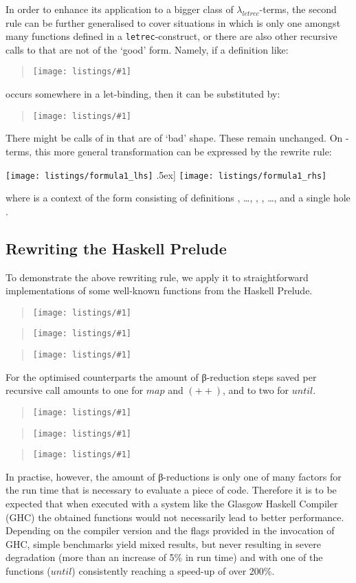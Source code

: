 \documentclass[submission,copyright,creativecommons]{eptcs}
\newcommand{\lambdaletrec}{\ensuremath{\lambda_\textit{letrec}}}
\newcommand{\letrec}{\texttt{letrec}}
\newcommand\listing[1]{\begin{quotation}\noindent\texttt{[image: listings/\#1]}\end{quotation}}
\newcommand\haskell[1]{\ensuremath{\mathit{#1}}}
\newcommand{\nbd}{\nobreakdash}
\renewcommand\;{\,}
\begin{document}
In order to enhance its application to a bigger class of \lambdaletrec\nbd-terms,
the second rule can be further generalised
to cover situations in which  is only one amongst many functions defined in
a \letrec\nbd-construct, or there
are also other recursive calls to  that are not of the `good' form. 
Namely, if a definition like: \listing{formula_lhs} occurs somewhere in a
let-binding, then it can be substituted by: \listing{formula_rhs}
There might be calls of  in  that are of `bad' shape. These remain unchanged. 
On \nbd-terms, this more general transformation can be expressed by the rewrite rule:
\begin{flushleft}
\vspace*{-0.5ex}
  \hspace*{6ex}\texttt{[image: listings/formula1\_lhs]}
  \0.5ex]
  \hspace*{6ex}\texttt{[image: listings/formula1\_rhs]}
\end{flushleft}
where  is a context of the form 
consisting of definitions , \ldots, , , \ldots,  and a single hole . 












\subsection{Rewriting the Haskell Prelude}


To demonstrate the above rewriting rule, we apply it to straightforward
implementations of some well-known functions from the Haskell Prelude.

\listing{map}
\listing{until}
\listing{append}

For the optimised counterparts the amount of β-reduction steps saved per
recursive call amounts to one for \haskell{map} and \haskell{(++)}, and to two
for \haskell{until}.

\listing{map_eff}
\listing{until_eff}
\listing{append_eff}

In practise, however, the amount of β\nbd-reductions is only one of many
factors for the run time that is necessary to evaluate a piece of code.
Therefore it is to be expected that when executed with a system like the
Glasgow Haskell Compiler (GHC) the obtained functions would not necessarily
lead to better performance. Depending on the compiler version and the flags
provided in the invocation of GHC, simple benchmarks yield mixed results, but
never resulting in severe degradation (more than an increase of 5\% in run
time) and with one of the functions (\haskell{until}) consistently reaching a
speed-up of over 200\%.
\end{document}
